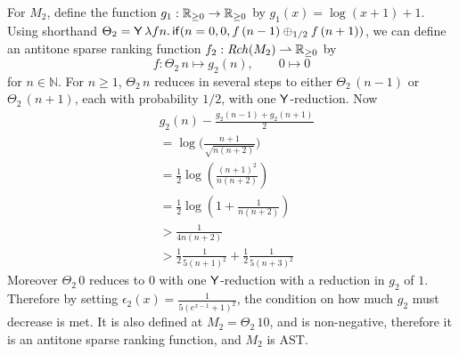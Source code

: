 \begin{example}
\label{ex:unbiased random walk}
For $M_2$, define the function $g_1 : \mathbb{R}_{{\geq}0} \to \mathbb{R}_{{\geq}0}$ by $g_1(x) = \log(x+1) + 1$.
Using shorthand 
$\Theta_2 = \mathsf{Y} \, \lambda f n . \, 
\mathsf{if}(n = 0, 0, f \, (n - 1) \oplus_{1/2} f \, (n + 1))$, 
we can define an antitone sparse ranking function $f_2 : \mathit{Rch}(M_2) \rightharpoonup \mathbb{R}_{{\geq}0}$ 
by
\[
f: {\Theta_2} \, n 
\mapsto 
g_2(n), \qquad 
0 \mapsto 0
\]
for $n \in \mathbb N$.
For $n \geq 1$, $\Theta_2 \, n$ reduces in several steps to either $\Theta_2 \, (n-1)$ or $\Theta_2 \, (n+1)$, each with probability $1/2$, with one $\mathsf{Y}$-reduction.
Now
\begin{align*}
& g_2(n) - \frac{g_2(n-1) + g_2(n+1)} 2 \\
  &=  \log \Big(\frac{n+1}{\sqrt{n(n+2)}}\Big) \\
  &=  \frac 1 2 \log\left(\frac{(n+1)^2}{n(n+2)}\right) \\
  &=  \frac 1 2 \log\left(1 + \frac 1 {n(n+2)}\right) \\
  &>  \frac 1 {4n(n+2)} \\
  &>  \frac 1 2 \frac 1 {5(n+1)^2} + \frac 1 2 \frac 1 {5(n+3)^2}
\end{align*}
Moreover $\Theta_2 \, 0$ reduces to $0$ with one $\mathsf{Y}$-reduction with a reduction in $g_2$ of $1$.
Therefore by setting $\epsilon_2(x) = \frac 1 {5(e^{x-1}+1)^2}$, the condition on how much $g_2$ must decrease is met. It is also defined at $M_2 = \Theta_2 \, 10$, and is non-negative, therefore it is an antitone sparse ranking function, and $M_2$ is AST.
\end{example}

